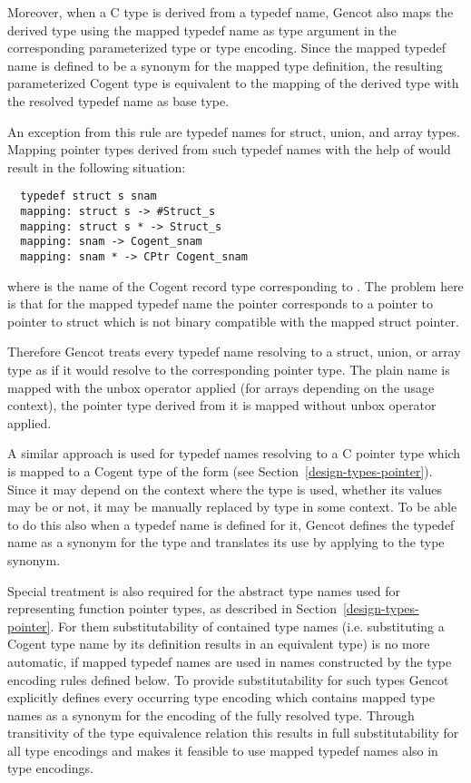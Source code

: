 Moreover, when a C type is derived from a typedef name, Gencot also maps the derived type using the mapped typedef name
as type argument in the corresponding parameterized type or type encoding. Since the mapped typedef name is defined to be a synonym 
for the mapped type definition, the resulting parameterized Cogent type is equivalent to the mapping of the derived 
type with the resolved typedef name as base type.

An exception from this rule are typedef names for struct, union, and array types. Mapping pointer types derived 
from such typedef names with the help of  would result in the following situation:
\begin{verbatim}
  typedef struct s snam
  mapping: struct s -> #Struct_s
  mapping: struct s * -> Struct_s
  mapping: snam -> Cogent_snam
  mapping: snam * -> CPtr Cogent_snam
\end{verbatim}
where  is the name of the Cogent record type corresponding to . The problem here
is that for the mapped typedef name the pointer corresponds to a pointer to pointer to struct which is not binary 
compatible with the mapped struct pointer.

Therefore Gencot treats every typedef name resolving to a struct, union, or array type as if 
it would resolve to the corresponding pointer type. The plain name is mapped with the unbox operator 
applied (for arrays depending on the usage context), the pointer type derived from it is mapped without 
unbox operator applied. 

A similar approach is used for typedef names resolving to a C pointer type which is mapped to a Cogent type of the 
form  (see Section~\ref{design-types-pointer}). Since it may depend on the context where the type
is used, whether its values may be  or not, it may be manually replaced by type  in some context.
To be able to do this also when a typedef name is defined for it, Gencot defines the typedef name as a synonym 
for the type  and translates its use by applying  to the type synonym.

Special treatment is also required for the abstract type names used for representing function pointer types, as
described in Section~\ref{design-types-pointer}. For them substitutability of contained type names (i.e. substituting
a Cogent type name by its definition results in an equivalent type) is no more automatic, if mapped typedef names 
are used in names constructed by the type encoding rules defined below. To provide substitutability
for such types Gencot explicitly defines every occurring type encoding which contains mapped type names as a synonym for the
encoding of the fully resolved type. Through transitivity of the type equivalence relation this results in full
substitutability for all type encodings and makes it feasible to use mapped typedef names also in type encodings.

